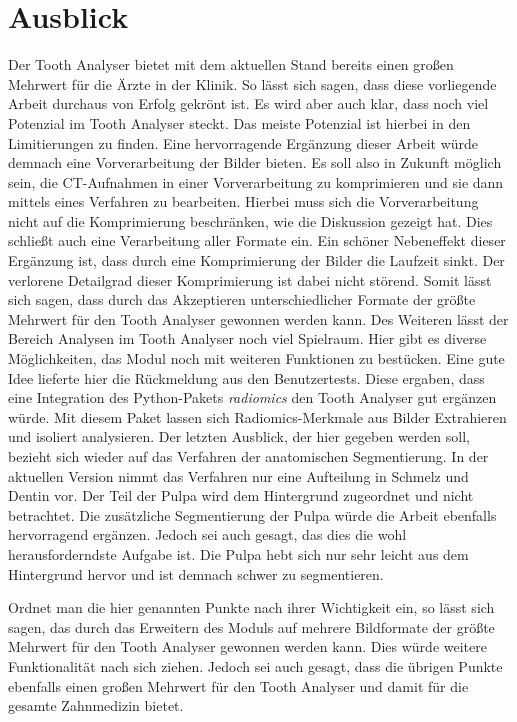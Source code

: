 \chapter{Ausblick}
\label{chap:schlussfolgerung} Der Tooth Analyser bietet mit dem aktuellen Stand bereits
einen großen Mehrwert für die Ärzte in der Klinik. So lässt sich sagen, dass diese
vorliegende Arbeit durchaus von Erfolg gekrönt ist. Es wird aber auch klar, dass
noch viel Potenzial im Tooth Analyser steckt. Das meiste Potenzial ist hierbei
in den Limitierungen zu finden. Eine hervorragende Ergänzung dieser Arbeit würde
demnach eine Vorverarbeitung der Bilder bieten. Es soll also in Zukunft möglich
sein, die \ac{CT}-Aufnahmen in einer Vorverarbeitung zu komprimieren und sie
dann mittels eines Verfahren zu bearbeiten. Hierbei muss sich die Vorverarbeitung
nicht auf die Komprimierung beschränken, wie die Diskussion gezeigt hat. Dies schließt
auch eine Verarbeitung aller Formate ein. Ein schöner Nebeneffekt dieser
Ergänzung ist, dass durch eine Komprimierung der Bilder die Laufzeit sinkt. Der
verlorene Detailgrad dieser Komprimierung ist dabei nicht störend. Somit lässt sich
sagen, dass durch das Akzeptieren unterschiedlicher Formate der größte Mehrwert
für den Tooth Analyser gewonnen werden kann. Des Weiteren lässt der Bereich Analysen
im Tooth Analyser noch viel Spielraum. Hier gibt es diverse Möglichkeiten, das Modul
noch mit weiteren Funktionen zu bestücken. Eine gute Idee lieferte hier die
Rückmeldung aus den Benutzertests. Diese ergaben, dass eine Integration des
Python-Pakets \textit{radiomics} den Tooth Analyser gut ergänzen würde. Mit
diesem Paket lassen sich Radiomics-Merkmale aus Bilder Extrahieren und isoliert
analysieren. Der letzten Ausblick, der hier gegeben werden soll, bezieht sich wieder
auf das Verfahren der anatomischen Segmentierung. In der aktuellen Version nimmt
das Verfahren nur eine Aufteilung in Schmelz und Dentin vor. Der Teil der Pulpa wird
dem Hintergrund zugeordnet und nicht betrachtet. Die zusätzliche Segmentierung
der Pulpa würde die Arbeit ebenfalls hervorragend ergänzen. Jedoch sei auch gesagt,
das dies die wohl herausforderndste Aufgabe ist. Die Pulpa hebt sich nur sehr leicht
aus dem Hintergrund hervor und ist demnach schwer zu segmentieren.

Ordnet man die hier genannten Punkte nach ihrer Wichtigkeit ein, so lässt sich
sagen, das durch das Erweitern des Moduls auf mehrere Bildformate der größte Mehrwert
für den Tooth Analyser gewonnen werden kann. Dies würde weitere Funktionalität
nach sich ziehen. Jedoch sei auch gesagt, dass die übrigen Punkte ebenfalls
einen großen Mehrwert für den Tooth Analyser und damit für die gesamte
Zahnmedizin bietet.
